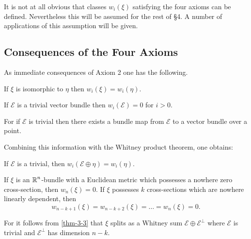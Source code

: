 It is not at all obvious that classes $w_i(\xi)$ satisfying the four axioms
can be defined. Nevertheless this will be assumed for the rest of \S 4. A
number of applications of this assumption will be given.

\subsection*{Consequences of the Four Axioms}
As immediate consequences of Axiom 2 one has the following.
\begin{proposition}\label{prop-4-1}
	If $\xi$ is isomorphic to $\eta$ then $w_i(\xi)=w_i(\eta)$.
\end{proposition}
\begin{proposition}\label{prop-4-2}
If $\mathcal{E}$ is a trivial vector bundle then $w_i(\mathcal{E})=0$ for $i>0$.
\end{proposition}

For if $\mathcal{E}$ is trivial then there exists a bundle map from $\mathcal{E}$ to a vector
bundle over a point.


Combining this information with the Whitney product theorem, one 
obtains:

\begin{proposition}\label{prop-4-3}
If $\mathcal{E}$ is a trivial, then $w_i(\mathcal{E}\oplus\eta)=w_i(\eta)$.
\end{proposition}
\begin{proposition}\label{prop-4-4}
If $\xi$ is an $\boldsymbol{\mathbb{R}}^n$-bundle with a Euclidean metric
which possesses a nowhere zero cross-section, then $w_n(\xi) = 0$.
If $\xi$ possesses $k$ cross-sections which are nowhere linearly
dependent, then
\[w_{n-k+1}(\xi)=w_{n-k+2}(\xi)=\dots=w_{n}(\xi)=0.\]
\end{proposition}

For it follows from \cref{thm-3-3} that $\xi$ splits as a Whitney sum
$\mathcal{E}\oplus\mathcal{E}^\perp$ where $\mathcal{E}$ is trivial and $\mathcal{E}^\perp$ has dimension $n-k$.

